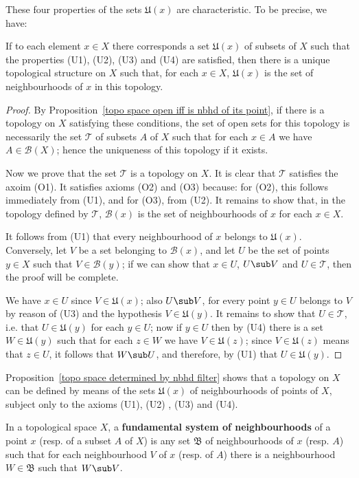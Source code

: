 These four properties of the sets $\mathfrak{U}(x)$ are characteristic. To be precise, we have:
\begin{proposition}\label{topo space determined by nbhd filter}
If to each element $x\in X$ there corresponds a set $\mathfrak{U}(x)$ of subsets of $X$ such that the properties (U1), (U2), (U3) and (U4) are satisfied, then there is a unique topological structure on $X$ such that, for each $x\in X$, $\mathfrak{U}(x)$ is the set of neighbourhoods of $x$ in this topology.
\end{proposition}
\begin{proof}
By Proposition~\ref{topo space open iff is nbhd of its point}, if there is a topology on $X$ satisfying these conditions, the set of open sets for this topology is necessarily the set $\mathcal{T}$ of subsets $A$ of $X$ such that for each $x\in A$ we have $A\in\mathcal{B}(X)$; hence the uniqueness of this topology if it exists.\par
Now we prove that the set $\mathcal{T}$ is a topology on $X$. It is clear that $\mathcal{T}$ satisfies the axoim (O1). It satisfies axioms (O2) and (O3) because: for (O2), this follows immediately from (U1), and for (O3), from (U2). It remains to show that, in the topology defined by $\mathcal{T}$, $\mathcal{B}(x)$ is the set of neighbourhoods of $x$ for each $x\in X$.\par
It follows from (U1) that every neighbourhood of $x$ belongs to $\mathfrak{U}(x)$. Conversely, let $V$ be a set belonging to $\mathcal{B}(x)$, and let $U$ be the set of points $y\in X$ such that $V\in\mathcal{B}(y)$; if we can show that $x\in U$, $U\sub V$ and $U\in\mathcal{T}$, then the proof will be complete.\par
We have $x\in U$ since $V\in\mathfrak{U}(x)$; also $U\sub V$, for every point $y\in U$ belongs to $V$ by reason of (U3) and the hypothesis $V\in\mathfrak{U}(y)$. It remains to show that $U\in\mathcal{T}$, i.e. that $U\in\mathfrak{U}(y)$ for each $y\in U$; now if $y\in U$ then by (U4) there is a set $W\in\mathfrak{U}(y)$ such that for each $z\in W$ we have $V\in\mathfrak{U}(z)$; since $V\in\mathfrak{U}(z)$ means that $z\in U$, it follows that $W\sub U$, and therefore, by (U1) that $U\in\mathfrak{U}(y)$.
\end{proof}
Proposition~\ref{topo space determined by nbhd filter} shows that a topology on $X$ can be defined by means of the sets $\mathfrak{U}(x)$ of neighbourhoods of points of $X$, subject only to the axioms (U1), (U2) , (U3) and (U4).
\begin{definition}
In a topological space $X$, a \textbf{fundamental system of neighbourhoods} of a point $x$ (resp. of a subset $A$ of $X$) is any set $\mathfrak{B}$ of neighbourhoods of $x$ (resp. $A$) such that for each neighbourhood $V$ of $x$ (resp. of $A$) there is a neighbourhood $W\in\mathfrak{B}$ such that $W\sub V$.
\end{definition}

